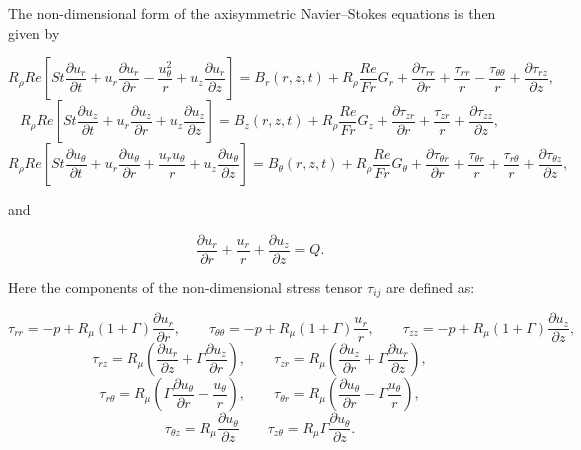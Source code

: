 The non-\/dimensional form of the axisymmetric Navier--Stokes equations is then given by \begin{center} \[ R_{\rho} Re \left[ St \frac{\partial u_r}{\partial t} + u_r \frac{\partial u_r}{\partial r} - \frac{u_\theta^2}{r} + u_z \frac{\partial u_r}{\partial z} \right] = B_r\left(r,z,t\right) + R_\rho \frac{Re}{Fr} G_r + \frac{\partial \tau_{rr}}{\partial r} + \frac{\tau_{rr}}{r} - \frac{\tau_{\theta\theta}}{r} + \frac{\partial \tau_{rz}}{\partial z}, \] \[ R_{\rho} Re \left[ St \frac{\partial u_z}{\partial t} + u_r \frac{\partial u_z}{\partial r} + u_z \frac{\partial u_z}{\partial z} \right] = B_z\left(r,z,t\right) + R_\rho \frac{Re}{Fr} G_z + \frac{\partial \tau_{zr}}{\partial r} + \frac{\tau_{zr}}{r} + \frac{\partial \tau_{zz}}{\partial z}, \] \[ R_{\rho} Re \left[ St \frac{\partial u_\theta}{\partial t} + u_r \frac{\partial u_\theta}{\partial r} + \frac{u_r u_\theta}{r} + u_z \frac{\partial u_\theta}{\partial z} \right] = B_\theta\left(r,z,t\right) + R_\rho \frac{Re}{Fr} G_\theta + \frac{\partial \tau_{\theta r}}{\partial r} + \frac{\tau_{\theta r}}{r} + \frac{\tau_{r \theta}}{r} + \frac{\partial \tau_{\theta z}}{\partial z}, \] \end{center} 

and

\begin{center} \[ \frac{\partial u_r}{\partial r} + \frac{u_r}{r} + \frac{\partial u_z}{\partial z} = Q. \] \end{center} 

Here the components of the non-\/dimensional stress tensor $ \tau_{ij} $ are defined as\+:

\begin{center} \[ \tau_{rr} = -p + R_\mu (1+\Gamma) \frac{\partial u_r}{\partial r}, \qquad \tau_{\theta\theta} = -p + R_\mu (1+\Gamma) \frac{u_r}{r}, \qquad \tau_{zz} = -p + R_\mu (1+\Gamma) \frac{\partial u_z}{\partial z}, \] \[ \tau_{rz} = R_\mu \left( \frac{\partial u_r}{\partial z} + \Gamma \frac{\partial u_z}{\partial r} \right), \qquad \tau_{zr} = R_\mu \left( \frac{\partial u_z}{\partial r} + \Gamma \frac{\partial u_r}{\partial z} \right), \] \[ \tau_{r \theta} = R_\mu \left( \Gamma \frac{\partial u_\theta}{\partial r} - \frac{u_\theta}{r} \right), \qquad \tau_{\theta r} = R_\mu \left( \frac{\partial u_\theta}{\partial r} - \Gamma \frac{u_\theta}{r} \right), \] \[ \tau_{\theta z} = R_\mu \frac{\partial u_\theta}{\partial z} \qquad \tau_{z \theta} = R_\mu \Gamma \frac{\partial u_\theta}{\partial z}. \] \end{center} 

